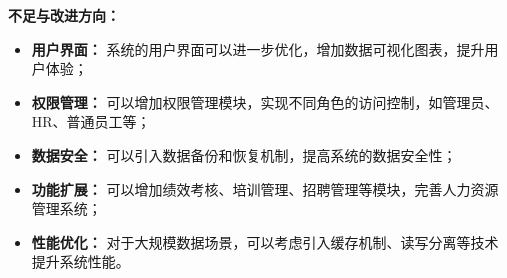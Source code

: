 \documentclass[12pt,a4paper]{article}
\begin{document}
\textbf{不足与改进方向：}

\begin{itemize}
  \item \textbf{用户界面：} 系统的用户界面可以进一步优化，增加数据可视化图表，提升用户体验；
  \item \textbf{权限管理：} 可以增加权限管理模块，实现不同角色的访问控制，如管理员、HR、普通员工等；
  \item \textbf{数据安全：} 可以引入数据备份和恢复机制，提高系统的数据安全性；
  \item \textbf{功能扩展：} 可以增加绩效考核、培训管理、招聘管理等模块，完善人力资源管理系统；
  \item \textbf{性能优化：} 对于大规模数据场景，可以考虑引入缓存机制、读写分离等技术提升系统性能。
\end{itemize}
\end{document}
